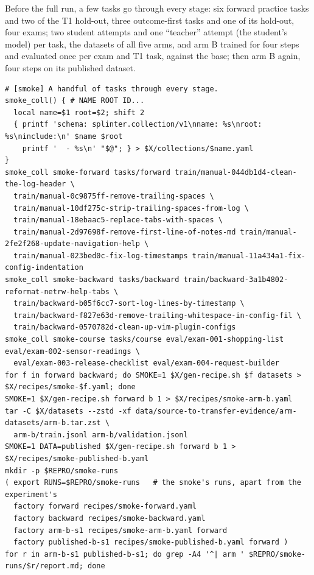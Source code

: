 \begin{sloppypar}
Before the full run, a few tasks go through every stage: six forward practice tasks and two of the T1 hold-out, three
outcome-first tasks and one of its hold-out, four exams; two student attempts and one ``teacher'' attempt (the student's model)
per task, the datasets of all five arms, and arm B trained for four steps and evaluated once per exam and T1 task, against the
base; then arm B again, four steps on its published dataset.
\end{sloppypar}

{\scriptsize
\begin{verbatim}
# [smoke] A handful of tasks through every stage.
smoke_coll() { # NAME ROOT ID...
  local name=$1 root=$2; shift 2
  { printf 'schema: splinter.collection/v1\nname: %s\nroot: %s\ninclude:\n' $name $root
    printf '  - %s\n' "$@"; } > $X/collections/$name.yaml
}
smoke_coll smoke-forward tasks/forward train/manual-044db1d4-clean-the-log-header \
  train/manual-0c9875ff-remove-trailing-spaces \
  train/manual-10df275c-strip-trailing-spaces-from-log \
  train/manual-18ebaac5-replace-tabs-with-spaces \
  train/manual-2d97698f-remove-first-line-of-notes-md train/manual-2fe2f268-update-navigation-help \
  train/manual-023bed0c-fix-log-timestamps train/manual-11a434a1-fix-config-indentation
smoke_coll smoke-backward tasks/backward train/backward-3a1b4802-reformat-netrw-help-tabs \
  train/backward-b05f6cc7-sort-log-lines-by-timestamp \
  train/backward-f827e63d-remove-trailing-whitespace-in-config-fil \
  train/backward-0570782d-clean-up-vim-plugin-configs
smoke_coll smoke-course tasks/course eval/exam-001-shopping-list eval/exam-002-sensor-readings \
  eval/exam-003-release-checklist eval/exam-004-request-builder
for f in forward backward; do SMOKE=1 $X/gen-recipe.sh $f datasets > $X/recipes/smoke-$f.yaml; done
SMOKE=1 $X/gen-recipe.sh forward b 1 > $X/recipes/smoke-arm-b.yaml
tar -C $X/datasets --zstd -xf data/source-to-transfer-evidence/arm-datasets/arm-b.tar.zst \
  arm-b/train.jsonl arm-b/validation.jsonl
SMOKE=1 DATA=published $X/gen-recipe.sh forward b 1 > $X/recipes/smoke-published-b.yaml
mkdir -p $REPRO/smoke-runs
( export RUNS=$REPRO/smoke-runs   # the smoke's runs, apart from the experiment's
  factory forward recipes/smoke-forward.yaml
  factory backward recipes/smoke-backward.yaml
  factory arm-b-s1 recipes/smoke-arm-b.yaml forward
  factory published-b-s1 recipes/smoke-published-b.yaml forward )
for r in arm-b-s1 published-b-s1; do grep -A4 '^| arm ' $REPRO/smoke-runs/$r/report.md; done
\end{verbatim}
}

